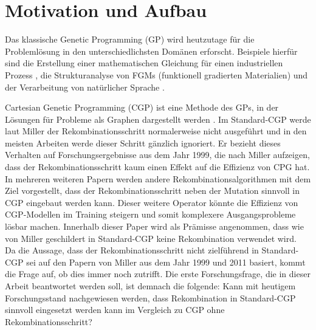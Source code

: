 \chapter{Motivation und Aufbau}
\label{Motivation und Aufbau}

Das klassische Genetic Programming (GP) wird heutzutage für die Problemlösung in den unterschiedlichsten Domänen erforscht.
Beispiele hierfür sind die Erstellung einer mathematischen Gleichung für einen industriellen Prozess \cite{sette_genetic_2001}, die Strukturanalyse von FGMs (funktionell gradierten Materialien) \cite{demirbas_stress_2022} und der Verarbeitung von natürlicher Sprache \cite{araujo_genetic_2020}.

Cartesian Genetic Programming (CGP) ist eine Methode des GPs, in der Lösungen für Probleme als Graphen dargestellt werden \cite{miller_cartesian_2020}. 
Im Standard-CGP werde laut Miller der Rekombinationsschritt normalerweise nicht ausgeführt und in den meisten Arbeiten werde dieser Schritt gänzlich ignoriert. 
Er bezieht dieses Verhalten auf Forschungsergebnisse aus dem Jahr 1999, die nach Miller aufzeigen, dass der Rekombinationsschritt kaum einen Effekt auf die Effizienz von CPG hat. \cite{miller_cartesian_2020} 
In mehreren weiteren Papern werden andere Rekombinationsalgorithmen mit dem Ziel vorgestellt, dass der Rekombinationsschritt neben der Mutation sinnvoll in CGP eingebaut werden kann. 
Dieser weitere Operator könnte die Effizienz von CGP-Modellen im Training steigern und somit komplexere Ausgangsprobleme lösbar machen.
Innerhalb dieser Paper wird als Prämisse angenommen, dass wie von Miller geschildert in Standard-CGP keine Rekombination verwendet wird. \cite{clegg_new_2007,kalkreuth_comprehensive_2020, torabi_using_2022}\\
Da die Aussage, dass der Rekombinationsschritt nicht zielführend in Standard-CGP sei auf den Papern von Miller aus dem Jahr 1999 und 2011 basiert, kommt die Frage auf, ob dies immer noch zutrifft.
Die erste Forschungsfrage, die in dieser Arbeit beantwortet werden soll, ist demnach die folgende: \glqq Kann mit heutigem Forschungsstand nachgewiesen werden, dass Rekombination in Standard-CGP sinnvoll eingesetzt werden kann im Vergleich zu CGP ohne Rekombinationsschritt?\grqq

